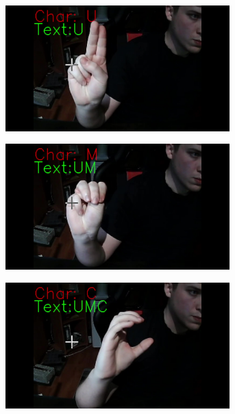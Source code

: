 \documentclass[a4paper,12pt,oneside]{book} %
\begin{document}
\begin{figure}[h]
	\centering
	\begin{subfigure}{0.4\textwidth}
		\centering
		\includegraphics[width=0.95\textwidth]{U.jpg}
	\end{subfigure}
	\begin{subfigure}{0.4\textwidth}
		\centering
		\includegraphics[width=0.95\textwidth]{UM.jpg}
	\end{subfigure}
	\begin{subfigure}{0.4\textwidth}
		\centering
		\includegraphics[width=0.95\textwidth]{UMC.jpg}

\end{subfigure}
\end{figure}
\end{document}
